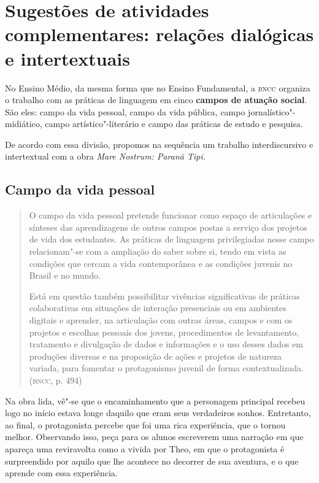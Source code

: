 \documentclass[12pt]{extarticle}
\begin{document}
\section{Sugestões de atividades complementares: relações dialógicas e
intertextuais}


No Ensino Médio, da mesma forma que no Ensino Fundamental, a \textsc{bncc}
organiza o trabalho com as práticas de linguagem em cinco \textbf{campos
de atuação social}. São eles: campo da vida pessoal, campo da vida
pública, campo jornalístico"-midiático, campo artístico"-literário e campo
das práticas de estudo e pesquisa.

De acordo com essa divisão, propomos na sequência um trabalho
interdiscursivo e intertextual com a obra \emph{Mare Nostrum: Paranã
Tipi.}

\subsection{Campo da vida pessoal}

\begin{quote}
O campo da vida pessoal pretende funcionar como espaço de articulações
e sínteses das aprendizagens de outros campos postas a serviço dos
projetos de vida dos estudantes. As práticas de linguagem privilegiadas
nesse campo relacionam"-se com a ampliação do saber sobre si, tendo em
vista as condições que cercam a vida contemporânea e as condições
juvenis no Brasil e no mundo.

Está em questão também possibilitar vivências significativas de práticas
colaborativas em situações de interação presenciais ou em ambientes
digitais e aprender, na articulação com outras áreas, campos e com os
projetos e escolhas pessoais dos jovens, procedimentos de levantamento,
tratamento e divulgação de dados e informações e o uso desses dados em
produções diversas e na proposição de ações e projetos de natureza
variada, para fomentar o protagonismo juvenil de forma
contextualizada. (\textsc{bncc}, p. 494)
\end{quote}

  Na obra lida, vê"-se que o encaminhamento que a personagem principal
  recebeu logo no início estava longe daquilo que eram seus verdadeiros
  sonhos. Entretanto, ao final, o protagonista percebe que foi uma rica
  experiência, que o tornou melhor. Observando isso, peça para os alunos
  escreverem uma narração em que apareça uma reviravolta como a vivida
  por Theo, em que o protagonista é surpreendido por aquilo que lhe
  acontece no decorrer de sua aventura, e o que aprende com essa
  experiência.
\end{document}
